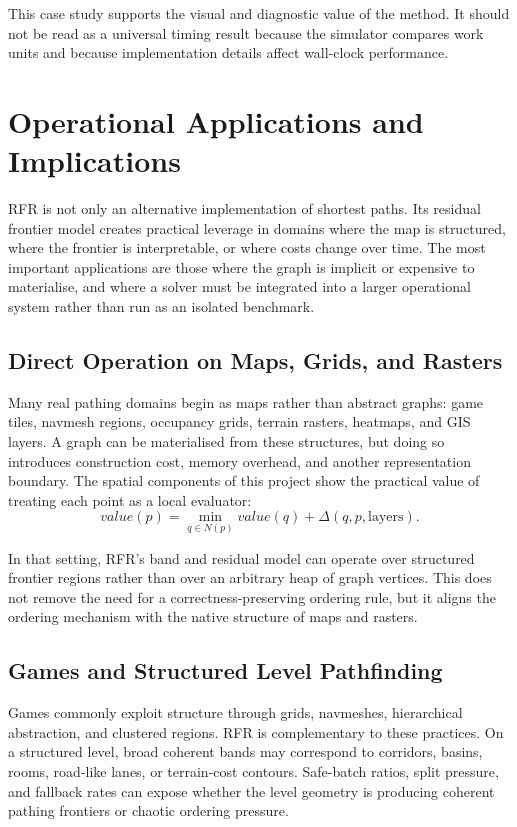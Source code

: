 \documentclass[11pt]{article}
\newcommand{\RFR}{\textsc{RFR}}
\begin{document}
This case study supports the visual and diagnostic value of the method. It should not be read as a universal timing result because the simulator compares work units and because implementation details affect wall-clock performance.

\section{Operational Applications and Implications}
\label{sec:applications}

\RFR{} is not only an alternative implementation of shortest paths. Its residual frontier model creates practical leverage in domains where the map is structured, where the frontier is interpretable, or where costs change over time. The most important applications are those where the graph is implicit or expensive to materialise, and where a solver must be integrated into a larger operational system rather than run as an isolated benchmark.

\subsection{Direct Operation on Maps, Grids, and Rasters}

Many real pathing domains begin as maps rather than abstract graphs: game tiles, navmesh regions, occupancy grids, terrain rasters, heatmaps, and GIS layers. A graph can be materialised from these structures, but doing so introduces construction cost, memory overhead, and another representation boundary. The spatial components of this project show the practical value of treating each point as a local evaluator:
\[
  value(p)=\min_{q\in N(p)} value(q)+\Delta(q,p,\text{layers}).
\]

In that setting, \RFR{}'s band and residual model can operate over structured frontier regions rather than over an arbitrary heap of graph vertices. This does not remove the need for a correctness-preserving ordering rule, but it aligns the ordering mechanism with the native structure of maps and rasters.

\subsection{Games and Structured Level Pathfinding}

Games commonly exploit structure through grids, navmeshes, hierarchical abstraction, and clustered regions. \RFR{} is complementary to these practices. On a structured level, broad coherent bands may correspond to corridors, basins, rooms, road-like lanes, or terrain-cost contours. Safe-batch ratios, split pressure, and fallback rates can expose whether the level geometry is producing coherent pathing frontiers or chaotic ordering pressure.
\end{document}
